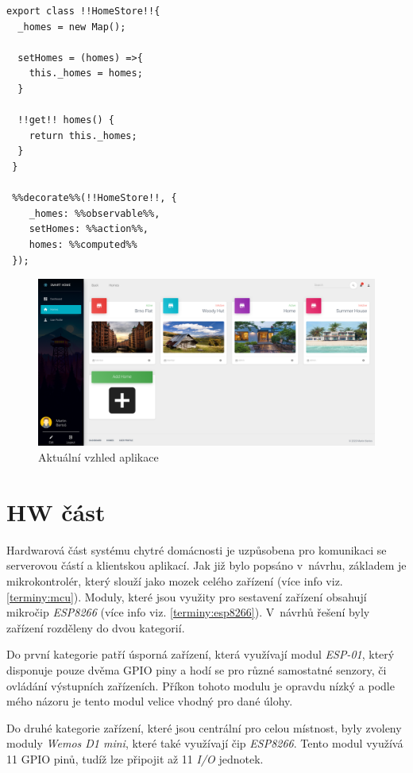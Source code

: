 \begin{lstlisting}[style=JavaScriptStyle,caption={Ukázka vytvoření \emph{store} pro domácnost}]
 export class !!HomeStore!!{
  _homes = new Map();

  setHomes = (homes) =>{
    this._homes = homes;
  }

  !!get!! homes() {
    return this._homes;
  }
 }

 %%decorate%%(!!HomeStore!!, {
    _homes: %%observable%%,
    setHomes: %%action%%,
    homes: %%computed%%
 });
\end{lstlisting}

\begin{figure}[hbt]
  \centering
  \includegraphics[width=1 \linewidth]{obrazky-figures/actualView.png}
  \caption{Aktuální vzhled aplikace}
  \label{figure:actual_app}
\end{figure}

\newpage
\section{HW část}
\label{impl:hw}
Hardwarová část systému chytré domácnosti je uzpůsobena pro komunikaci se serverovou částí a klientskou aplikací.
Jak již bylo popsáno v~návrhu, základem je mikrokontrolér, který slouží jako mozek celého zařízení (více info viz. \ref{terminy:mcu}).
Moduly, které jsou využity pro sestavení zařízení obsahují mikročip \emph{ESP8266} (více info viz. \ref{terminy:esp8266}).
V~návrhů řešení byly zařízení rozděleny do dvou kategorií.

Do první kategorie patří úsporná zařízení, která využívají modul \emph{ESP-01}, který disponuje pouze dvěma GPIO piny a hodí se pro různé samostatné senzory, či ovládání výstupních zařízeních.
Příkon tohoto modulu je opravdu nízký a podle mého názoru je tento modul velice vhodný pro dané úlohy.

Do druhé kategorie zařízení, které jsou centrální pro celou místnost, byly zvoleny moduly \emph{Wemos D1 mini}, které také využívají čip \emph{ESP8266}.
Tento modul využívá 11 GPIO pinů, tudíž lze připojit až 11 \emph{I/O} jednotek.

